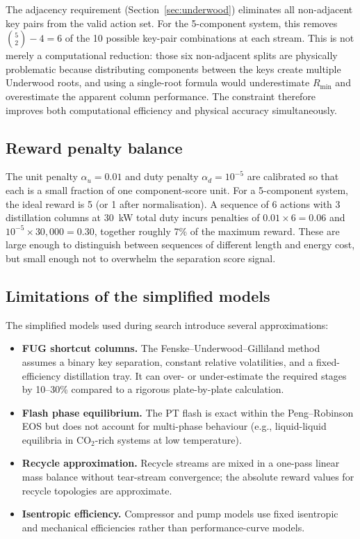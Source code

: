 \documentclass[11pt,a4paper]{article}
\theoremstyle{definition}
\theoremstyle{plain}
\begin{document}
The adjacency requirement (Section~\ref{sec:underwood}) eliminates all non-adjacent key pairs from the valid action set. For the 5-component system, this removes $\binom{5}{2} - 4 = 6$ of the 10 possible key-pair combinations at each stream. This is not merely a computational reduction: those six non-adjacent splits are physically problematic because distributing components between the keys create multiple Underwood roots, and using a single-root formula would underestimate $R_{\min}$ and overestimate the apparent column performance. The constraint therefore improves both computational efficiency and physical accuracy simultaneously.

\subsection{Reward penalty balance}

The unit penalty $\alpha_u = 0.01$ and duty penalty $\alpha_d = 10^{-5}$ are calibrated so that each is a small fraction of one component-score unit. For a 5-component system, the ideal reward is 5 (or 1 after normalisation). A sequence of 6 actions with 3 distillation columns at 30~kW total duty incurs penalties of $0.01 \times 6 = 0.06$ and $10^{-5} \times 30{,}000 = 0.30$, together roughly 7\% of the maximum reward. These are large enough to distinguish between sequences of different length and energy cost, but small enough not to overwhelm the separation score signal.

\subsection{Limitations of the simplified models}

The simplified models used during search introduce several approximations:

\begin{itemize}
 \item \textbf{FUG shortcut columns.} The Fenske--Underwood--Gilliland method assumes a binary key separation, constant relative volatilities, and a fixed-efficiency distillation tray. It can over- or under-estimate the required stages by 10--30\% compared to a rigorous plate-by-plate calculation.
 \item \textbf{Flash phase equilibrium.} The PT flash is exact within the Peng--Robinson EOS but does not account for multi-phase behaviour (e.g., liquid-liquid equilibria in CO$_2$-rich systems at low temperature).
 \item \textbf{Recycle approximation.} Recycle streams are mixed in a one-pass linear mass balance without tear-stream convergence; the absolute reward values for recycle topologies are approximate.
 \item \textbf{Isentropic efficiency.} Compressor and pump models use fixed isentropic and mechanical efficiencies rather than performance-curve models.
\end{itemize} 
\end{document}

